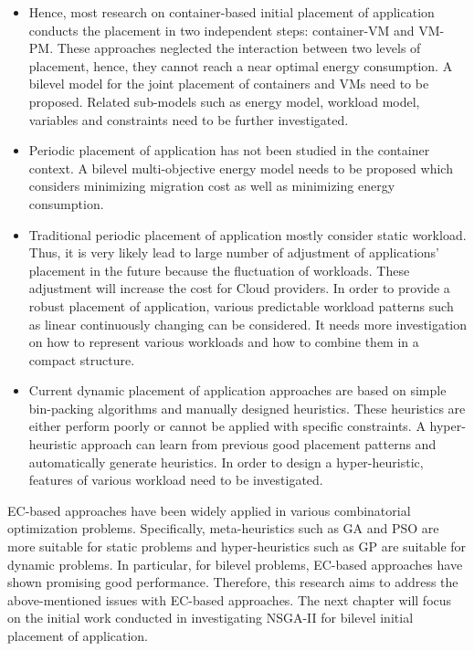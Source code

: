 \begin{itemize}
	\item {} Hence, most research on container-based initial placement of application conducts the placement in two independent steps: container-VM and VM-PM. These approaches neglected the interaction between two levels of placement, hence, they cannot reach a near optimal energy consumption. A bilevel model for the joint placement of containers and VMs need to be proposed. Related sub-models such as energy model, workload model, variables and constraints need to be further investigated.
	\item Periodic placement of application has not been studied in the container context. A bilevel multi-objective energy model needs to be proposed which considers minimizing migration cost as well as minimizing energy consumption. 
	\item Traditional periodic placement of application mostly consider static workload. Thus, it is very likely lead to large number of adjustment of applications' placement in the future because the fluctuation of workloads. These adjustment will increase the cost for Cloud providers. In order to provide a robust placement of application, various predictable workload patterns such as linear continuously changing can be considered. It needs more investigation on how to represent various workloads and how to combine them in a compact structure.
	\item Current dynamic placement of application approaches are based on simple bin-packing algorithms and manually designed heuristics. These heuristics are either perform poorly or cannot be applied with specific constraints. A hyper-heuristic approach can learn from previous good placement patterns and automatically generate heuristics. In order to design a hyper-heuristic, features of various workload need to be investigated. 
\end{itemize}

EC-based approaches have been widely applied in various combinatorial optimization problems. Specifically, meta-heuristics such as GA and PSO are more suitable for static problems and hyper-heuristics such as GP are suitable for dynamic problems. In particular, for bilevel problems, EC-based approaches have shown promising good performance. Therefore, this research aims to address the above-mentioned issues with EC-based approaches. The next chapter will focus on the initial work conducted in investigating NSGA-II for bilevel initial placement of application.


